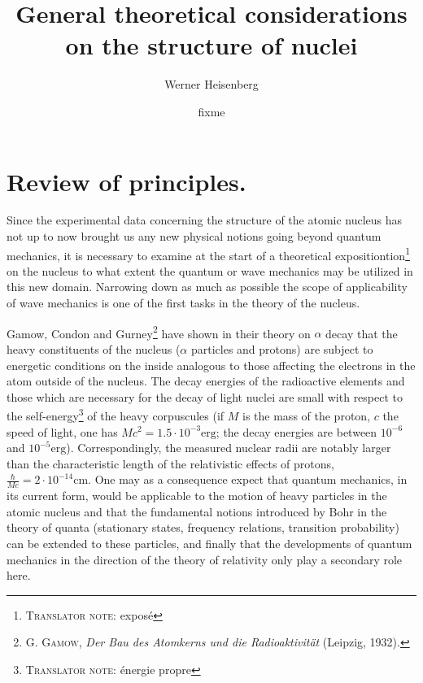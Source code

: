 \documentclass[a4paper,11pt]{article}
\newcommand{\?}[2]{#1\footnote{\textsc{Translator note}: #2}}
\newcommand{\unit}[1]{\text{#1}}
\newcommand{\citeauthor}[1]{\textsc{#1}}
\newcommand{\citetitle}[1]{\textit{#1}}
\newcommand{\publication}[1]{%
    \gdef\puB{#1}}
\newcommand{\puB}{}
\newcommand{\location}[1]{%
    \gdef\loB{#1}}
\newcommand{\loB}{}
\begin{document}
\title{General theoretical considerations on the structure of nuclei}

\author{Werner Heisenberg}
\location{Solvay}
\publication{Solvay 1933}
\date{fixme}

\maketitle

\tableofcontents

\section{Review of principles.}

Since the experimental data concerning the structure of the atomic nucleus has not up to now brought us any new physical notions going beyond quantum mechanics, it is necessary to examine at the start of a theoretical \?{expositiontion}{expos\'e} on the nucleus to what extent the quantum or wave mechanics may be utilized in this new domain. Narrowing down as much as possible the scope of applicability of wave mechanics is one of the first tasks in the theory of the nucleus.

Gamow, Condon and Gurney\footnote{\citeauthor{G. Gamow}, \citetitle{Der Bau des Atomkerns und die Radioaktivit\"at} (Leipzig, 1932).} have shown in their theory on $\alpha$ decay that the heavy constituents of the nucleus ($\alpha$ particles and protons) are subject to energetic conditions on the inside analogous to those affecting the electrons in the atom outside of the nucleus. The decay energies of the radioactive elements and those which are necessary for the decay of light nuclei are small with respect to the \?{self-energy}{\'energie propre} of the heavy corpuscules (if $M$ is the mass of the proton, $c$ the speed of light, one has $Mc^2 = 1.5\cdot 10^{-3}\unit{erg}$; the decay energies are between $10^{-6}$ and $10^{-5}\unit{erg}$). Correspondingly, the measured nuclear radii are notably larger than the characteristic length of the relativistic effects of protons, $\frac{\hbar}{Mc} = 2\cdot 10^{-14}\unit{cm}$. One may as a consequence expect that quantum mechanics, in its current form, would be applicable to the motion of heavy particles in the atomic nucleus and that the fundamental notions introduced by Bohr in the theory of quanta (stationary states, frequency relations, transition probability) can be extended to these particles, and finally that the developments of quantum mechanics in the direction of the theory of relativity only play a secondary role here.
\end{document}
